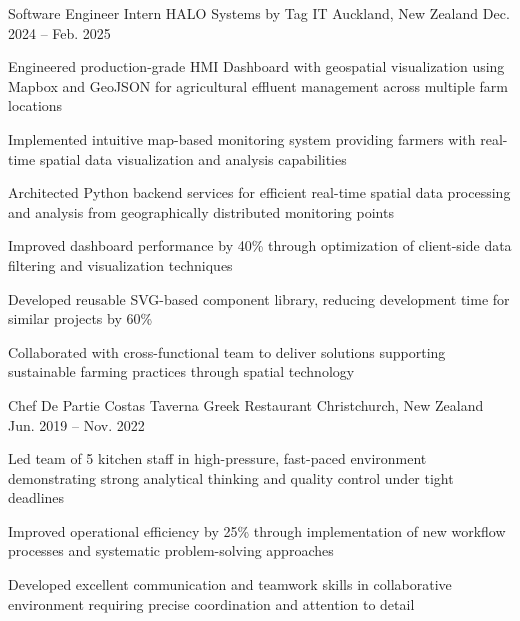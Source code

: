 \documentclass[11pt, a4paper]{awesome-cv}
\begin{document}
\begin{cventries}
  \cventry
    {Software Engineer Intern} %
    {HALO Systems by Tag IT} %
    {Auckland, New Zealand} %
    {Dec. 2024 -- Feb. 2025} %
    {
      \begin{cvitems}
        \item {Engineered production-grade HMI Dashboard with geospatial visualization using Mapbox and GeoJSON for agricultural effluent management across multiple farm locations}
        \item {Implemented intuitive map-based monitoring system providing farmers with real-time spatial data visualization and analysis capabilities}
        \item {Architected Python backend services for efficient real-time spatial data processing and analysis from geographically distributed monitoring points}
        \item {Improved dashboard performance by 40\% through optimization of client-side data filtering and visualization techniques}
        \item {Developed reusable SVG-based component library, reducing development time for similar projects by 60\%}
        \item {Collaborated with cross-functional team to deliver solutions supporting sustainable farming practices through spatial technology}
      \end{cvitems}
    }

  \cventry
    {Chef De Partie} %
    {Costas Taverna Greek Restaurant} %
    {Christchurch, New Zealand} %
    {Jun. 2019 -- Nov. 2022} %
    {
      \begin{cvitems}
        \item {Led team of 5 kitchen staff in high-pressure, fast-paced environment demonstrating strong analytical thinking and quality control under tight deadlines}
        \item {Improved operational efficiency by 25\% through implementation of new workflow processes and systematic problem-solving approaches}
        \item {Developed excellent communication and teamwork skills in collaborative environment requiring precise coordination and attention to detail}
      \end{cvitems}
    }
\end{cventries}
\end{document}
